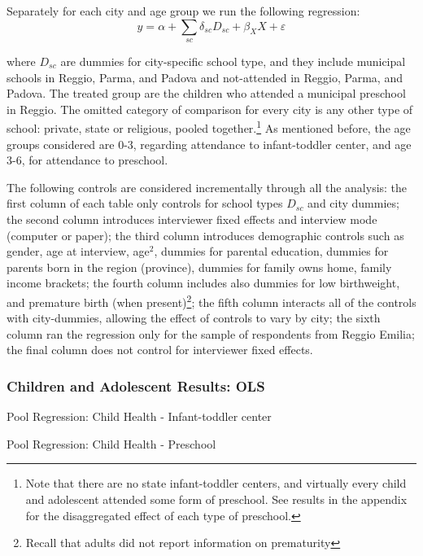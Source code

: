\begin{table}[H]
\begin{table}[H]
\begin{table}[H]
\begin{table}[H]
\begin{table}[H]
\begin{table}[H]
Separately for each city and age group we run the following regression:
\[ 
y = \alpha + \sum_{sc} \delta_{sc} D_{sc} + \beta_{X}X + \varepsilon
\]

where $D_{sc}$ are dummies for city-specific school type, and they include municipal schools in Reggio, Parma, and Padova and not-attended in Reggio, Parma, and Padova. The treated group are the children who attended a municipal preschool in Reggio. The omitted category of comparison for every city is any other type of school: private, state or religious, pooled together.\footnote{Note that there are no state infant-toddler centers, and virtually every child and adolescent attended some form of preschool. See results in the appendix for the disaggregated effect of each type of preschool.} As mentioned before, the age groups considered are 0-3, regarding attendance to infant-toddler center, and age 3-6, for attendance to preschool. 

The following controls are considered incrementally through all the analysis: the first column of each table only controls for school types $D_{sc}$ and city dummies; the second column introduces interviewer fixed effects and interview mode (computer or paper); the third column introduces demographic controls such as gender, age at interview, age$^2$, dummies for parental education, dummies for parents born in the region (province), dummies for family owns home, family income brackets; the fourth column includes also dummies for low birthweight, and premature birth (when present)\footnote{Recall that adults did not report information on prematurity}; the fifth column interacts all of the controls with city-dummies, allowing the effect of controls to vary by city; the sixth column ran the regression only for the sample of respondents from Reggio Emilia; the final column does not control for interviewer fixed effects.


\singlespacing
\setlength\tabcolsep{0.25em}
\subsubsection{Children and Adolescent Results: OLS}
\begin{small}
\begin{table}[H]
\caption{Pool Regression: Child Health - Infant-toddler center}
  
\end{table}
\begin{table}[H]
\caption{Pool Regression: Child Health - Preschool}

\end{table}


\end{small}
\end{table}
\end{table}
\end{table}
\end{table}
\end{table}
\end{table}
